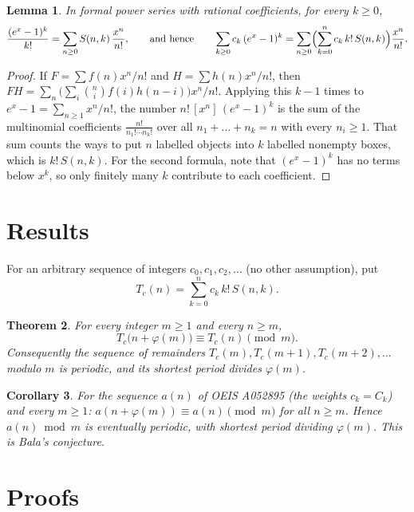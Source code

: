 \documentclass[11pt,a4paper]{article}
\newtheorem{theorem}{Theorem}[section]
\newtheorem{lemma}[theorem]{Lemma}
\newtheorem{corollary}[theorem]{Corollary}
\theoremstyle{definition}
\theoremstyle{remark}
\newcommand{\coeff}[2]{[x^{#1}]\,#2}
\begin{document}
\begin{lemma}\label{lem:egf}
In formal power series with rational coefficients, for every $k\ge0$,
\[
\frac{(e^x-1)^k}{k!}=\sum_{n\ge0}S(n,k)\,\frac{x^n}{n!},
\qquad\text{and hence}\qquad
\sum_{k\ge0}c_k\,(e^x-1)^k=\sum_{n\ge0}\Bigl(\sum_{k=0}^nc_k\,k!\,S(n,k)\Bigr)\frac{x^n}{n!}.
\]
\end{lemma}

\begin{proof}
If $F=\sum f(n)x^n/n!$ and $H=\sum h(n)x^n/n!$, then $FH=\sum_n\bigl(\sum_i\binom ni f(i)h(n-i)\bigr)x^n/n!$. Applying this
$k-1$ times to $e^x-1=\sum_{n\ge1}x^n/n!$, the number $n!\,\coeff{n}{(e^x-1)^k}$ is the sum of the multinomial coefficients
$\frac{n!}{n_1!\cdots n_k!}$ over all $n_1+\dots+n_k=n$ with every $n_i\ge1$. That sum counts the ways to put $n$ labelled
objects into $k$ labelled nonempty boxes, which is $k!\,S(n,k)$. For the second formula, note that $(e^x-1)^k$ has no
terms below $x^k$, so only finitely many $k$ contribute to each coefficient.
\end{proof}


\section{Results}\label{sec:results}

For an arbitrary sequence of integers $c_0,c_1,c_2,\dots$ (no other assumption), put
\begin{equation}\label{eq:transform}
T_c(n)=\sum_{k=0}^{n}c_k\,k!\,S(n,k).
\end{equation}

\begin{theorem}\label{thm:main}
For every integer $m\ge1$ and every $n\ge m$,
\[
T_c\bigl(n+\varphi(m)\bigr)\equiv T_c(n)\pmod m .
\]
Consequently the sequence of remainders $T_c(m),T_c(m+1),T_c(m+2),\dots$ modulo $m$ is periodic, and its shortest period
divides $\varphi(m)$.
\end{theorem}

\begin{corollary}\label{cor:seq}
For the sequence $a(n)$ of OEIS A052895 (the weights $c_k=C_k$) and every $m\ge1$:
$a(n+\varphi(m))\equiv a(n)\pmod m$ for all $n\ge m$. Hence $a(n)\bmod m$ is eventually periodic, with shortest period
dividing $\varphi(m)$. This is Bala's conjecture.
\end{corollary}

\section{Proofs}\label{sec:proofs}
\end{document}

